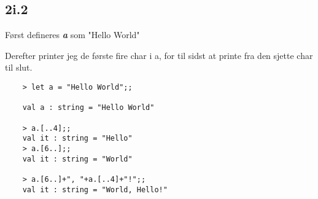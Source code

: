 \subsection{2i.2}

Først defineres \textit{\textbf{a}} som "Hello World"

Derefter printer jeg de første fire char i a, for til sidst at printe fra den sjette char til slut. 

\lstset{}
\begin{lstlisting}
	> let a = "Hello World";;
	
	val a : string = "Hello World"
	
	> a.[..4];;
	val it : string = "Hello"
	> a.[6..];;
	val it : string = "World"
	
	> a.[6..]+", "+a.[..4]+"!";;
	val it : string = "World, Hello!"

\end{lstlisting}



